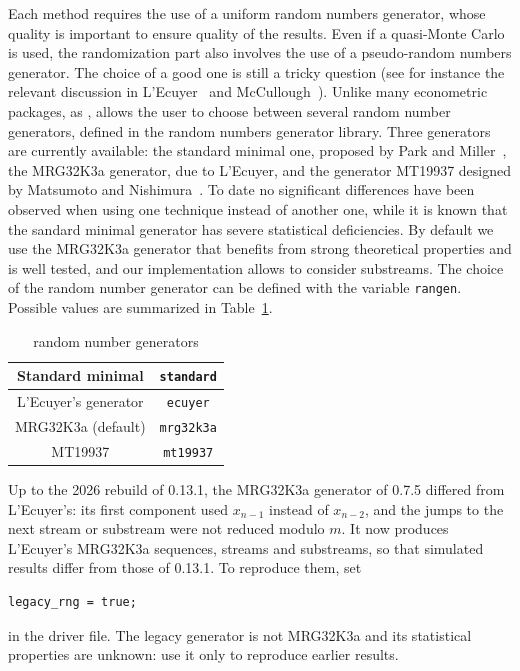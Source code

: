 Each method requires the use of a uniform random numbers generator,
whose quality is important to ensure quality of the results.
Even if a quasi-Monte Carlo is used, the randomization part also involves the
use of a pseudo-random numbers generator.
The choice of a good one is still a tricky question (see for instance the
relevant discussion in L'Ecuyer~\cite{LEcu97} and McCullough~\cite{McCu06}).
Unlike many econometric packages, as \limdep, \amlet{} allows the user
to choose between several random number generators, defined in the
random numbers generator library.
Three generators are currently available: the standard minimal one,
proposed by Park and Miller~\cite{ParkMill88}, the MRG32K3a generator, due to L'Ecuyer, and the generator MT19937 designed by
Matsumoto and Nishimura~\cite{MatsNish98}.
To date no significant differences have been observed when using one
technique instead of another one, while it is known that the sandard minimal generator has severe statistical deficiencies.
By default we use the MRG32K3a generator that benefits from strong theoretical properties and is well tested, and our implementation allows to consider substreams.
The choice of the random number generator can be defined with the
variable \verb|rangen|. Possible values are summarized in
Table~\ref{tab:rangen}.

\begin{table}[htb]
\begin{center}
\begin{tabular}{|c|c|}
\hline
Standard minimal & \verb|standard| \\
\hline
L'Ecuyer's generator & \verb|ecuyer| \\
\hline
MRG32K3a (default) & \verb|mrg32k3a| \\
\hline
MT19937 & \verb|mt19937| \\
\hline
\end{tabular}
\caption{random number generators}
\label{tab:rangen}
\end{center}
\end{table}

Up to the 2026 rebuild of \amlet{} 0.13.1, the MRG32K3a generator of
\oratio{} 0.7.5 differed from L'Ecuyer's: its first component used
$x_{n-1}$ instead of $x_{n-2}$, and the jumps to the next stream or
substream were not reduced modulo $m$. It now produces L'Ecuyer's
MRG32K3a sequences, streams and substreams, so that simulated results
differ from those of \amlet{} 0.13.1. To reproduce them, set
\begin{verbatim}
legacy_rng = true;
\end{verbatim}
in the driver file. The legacy generator is not MRG32K3a and its
statistical properties are unknown: use it only to reproduce earlier
results.

